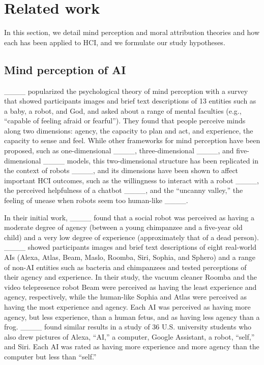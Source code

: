 \section{Related work}
In this section, we detail mind perception and moral attribution theories and how each has been applied to HCI, and we formulate our study hypotheses.

\subsection{Mind perception of AI}

____ popularized the psychological theory of mind perception with a survey that showed participants images and brief text descriptions of 13 entities such as a baby, a robot, and God, and asked about a range of mental faculties (e.g., “capable of feeling afraid or fearful”). They found that people perceive minds along two dimensions: agency, the capacity to plan and act, and experience, the capacity to sense and feel. While other frameworks for mind perception have been proposed, such as one-dimensional ____, three-dimensional ____, and five-dimensional ____ models, this two-dimensional structure has been replicated in the context of robots ____, and its dimensions have been shown to affect important HCI outcomes, such as the willingness to interact with a robot ____, the perceived helpfulness of a chatbot ____, and the “uncanny valley,” the feeling of unease when robots seem too human-like ____.

In their initial work, ____ found that a social robot was perceived as having a moderate degree of agency (between a young chimpanzee and a five-year old child) and a very low degree of experience (approximately that of a dead person). ____ showed participants images and brief text descriptions of eight real-world AIs (Alexa, Atlas, Beam, Maslo, Roomba, Siri, Sophia, and Sphero) and a range of non-AI entities such as bacteria and chimpanzees and tested perceptions of their agency and experience. In their study, the vacuum cleaner Roomba and the video telepresence robot Beam were perceived as having the least experience and agency, respectively, while the human-like Sophia and Atlas were perceived as having the most experience and agency. Each AI was perceived as having more agency, but less experience, than a human fetus, and as having less agency than a frog. ____ found similar results in a study of 36 U.S. university students who also drew pictures of Alexa, “AI,” a computer, Google Assistant, a robot, “self,” and Siri. Each AI was rated as having more experience and more agency than the computer but less than “self.”

